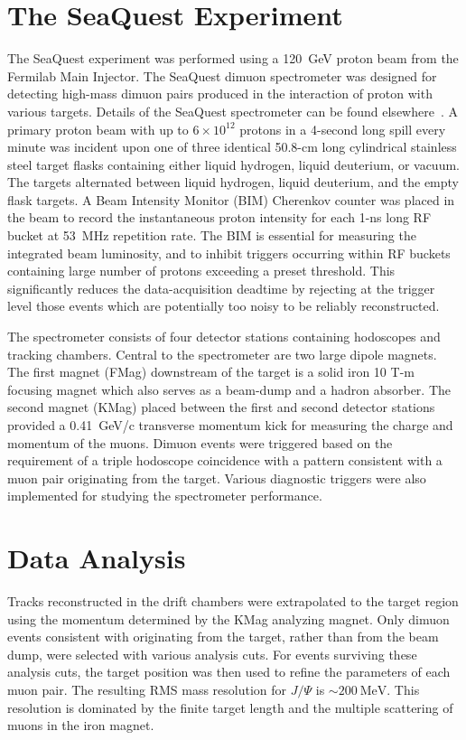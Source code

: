 \documentclass[reprint,aps,unsortedaddress,superscriptaddress,prd,floatfix,showpacs,linenumbers]{revtex4-2}
\begin{document}
\section{The SeaQuest Experiment}
\label{sec:SeaQuest}
The SeaQuest experiment was performed using a \SI{120}{\GeV} proton beam from the
Fermilab Main Injector. The SeaQuest dimuon spectrometer was designed for
detecting high-mass dimuon pairs produced in the interaction of proton
with various targets. Details of the SeaQuest spectrometer can be found
elsewhere~\cite{aidala2019}. A primary proton beam with up to $6 \times 10^{12}$
protons in a 4-second long spill every minute was incident upon one
of three identical 50.8-cm long cylindrical stainless steel
target flasks containing either liquid hydrogen, liquid deuterium,
or vacuum. The targets alternated between liquid hydrogen, liquid deuterium,
and the empty flask targets. A Beam Intensity Monitor (BIM) Cherenkov counter
was placed in the beam to record the instantaneous proton intensity for
each 1-ns long RF bucket at \SI{53}{\MHz} repetition rate. The BIM is essential
for measuring the integrated beam luminosity, and to inhibit triggers
occurring within RF buckets containing large number of protons
exceeding a preset threshold. This significantly reduces the data-acquisition
deadtime by rejecting at the trigger level those events which are potentially
too noisy to be reliably reconstructed.

The spectrometer consists of four detector stations containing
hodoscopes and tracking chambers.
Central to the spectrometer are two large dipole magnets.
The first magnet (FMag) downstream of the target is a solid iron 10
T-m focusing magnet which
also serves as a beam-dump and a hadron absorber. The second
magnet (KMag) placed between the first and second detector stations
provided a \SI{0.41}{\GeV/c} transverse momentum kick
for measuring the charge and momentum of the muons. Dimuon events
were triggered based on the requirement of a triple hodoscope
coincidence with a pattern consistent with a muon pair originating
from the target. Various diagnostic triggers were also implemented
for studying the spectrometer performance.

\section{Data Analysis}
\label{sec:analysis}
Tracks reconstructed in the drift chambers were extrapolated
to the target region using the momentum determined by
the KMag analyzing magnet. Only dimuon events consistent with originating
from the target, rather than from the beam dump, were selected with various
analysis cuts. For events surviving these analysis cuts, the target
position was then used to
refine the parameters of each muon pair. The resulting
RMS mass resolution for $J/\Psi$ is $\sim\SI{200}{\MeV}$.
This resolution is dominated by the finite target length and the
multiple scattering of muons in the iron magnet.
\end{document}
